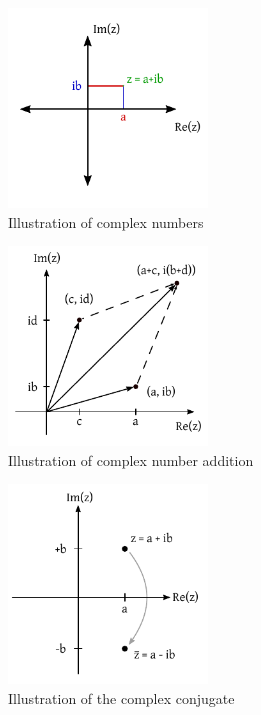 \documentclass[a4paper,landscape,twocolumn]{article}
\theoremstyle{definition}
\begin{document}
\begin{figure}[!ht]
  \begin{center}
    \includegraphics[width=200px]{img/complex_numbers_illustration.pdf}
    \caption{Illustration of complex numbers}
  \end{center}
\end{figure}
\begin{figure}[!ht]
  \begin{center}
    \includegraphics[width=200px]{img/complex_numbers_addition.pdf}
    \caption{Illustration of complex number addition}
  \end{center}
\end{figure}
\begin{figure}[!ht]
  \begin{center}
    \includegraphics[width=200px]{img/complex_numbers_conjugate.pdf}
    \caption{Illustration of the complex conjugate}
  \end{center}
\end{figure}
\end{document}
